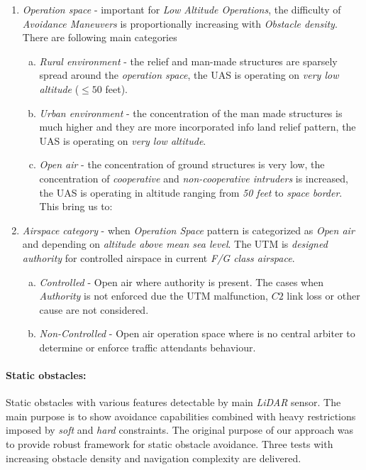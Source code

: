 \begin{enumerate}
    \item \emph{Operation space} - important for \emph{Low Altitude Operations}, the difficulty of \emph{Avoidance Maneuvers} is proportionally increasing with \emph{Obstacle density}. There are following main categories
    \begin{enumerate}[a.]
        \item \emph{Rural environment} - the relief and man-made structures are sparsely spread around the \emph{operation space}, the UAS is operating on \emph{very low altitude} ($\le 50$ feet).
        
        \item \emph{Urban environment} - the concentration of the man made structures is much higher and they are more incorporated info land relief pattern, the UAS is operating on \emph{very low altitude}.
        
        \item \emph{Open air} - the concentration of ground structures is very low, the concentration of \emph{cooperative} and \emph{non-cooperative intruders} is increased, the UAS is operating in altitude ranging from \emph{50 feet} to \emph{space border}. This bring us to:
    \end{enumerate}
    
    \item \emph{Airspace category} -  when \emph{Operation Space} pattern is categorized as \emph{Open air} and depending on \emph{altitude above mean sea level}. The UTM  is \emph{designed authority} for controlled airspace in current \emph{F/G class airspace}.
    \begin{enumerate}[a.]
        \item \emph{Controlled} - Open air where authority is present. The cases when \emph{Authority} is not enforced due the UTM malfunction, $C2$ link loss or other cause are not considered.
        
        \item \emph{Non-Controlled} - Open air operation space where is no central arbiter to determine or enforce traffic attendants behaviour.
        
    \end{enumerate}
\end{enumerate}

\paragraph{Static obstacles:}  Static obstacles with various features detectable by main \emph{LiDAR} sensor. The main purpose is to show avoidance capabilities combined with heavy restrictions imposed by \emph{soft} and \emph{hard} constraints. The original purpose of our approach was to provide robust framework for static obstacle avoidance. Three tests with increasing obstacle density and navigation complexity are delivered.

